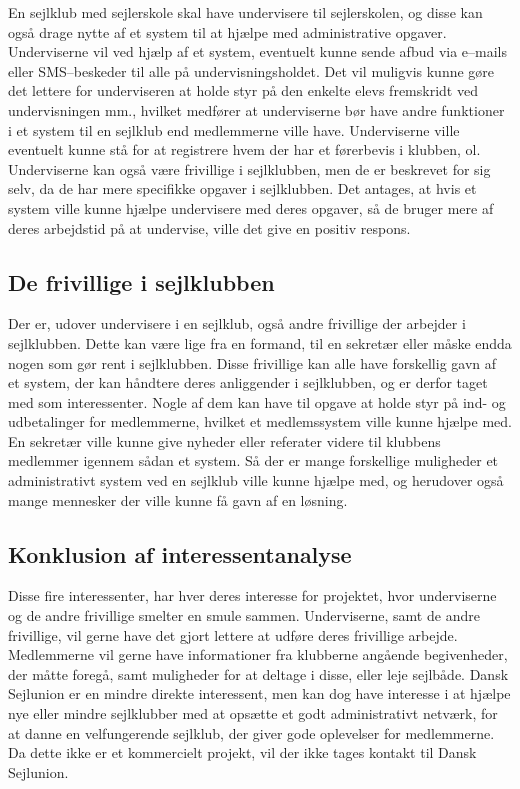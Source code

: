 En sejlklub med sejlerskole skal have undervisere til sejlerskolen, og disse kan også drage nytte af et system
til at hjælpe med administrative opgaver. 
Underviserne vil ved hjælp af et system, eventuelt kunne sende afbud via e--mails eller SMS--beskeder til alle på undervisningsholdet. 
Det vil muligvis kunne gøre det lettere for underviseren at holde styr på den enkelte elevs fremskridt ved undervisningen mm., hvilket medfører at
underviserne bør have andre funktioner i et system til en sejlklub end medlemmerne ville have. Underviserne
ville eventuelt kunne stå for at registrere hvem der har et førerbevis i klubben, ol. Underviserne kan også
være frivillige i sejlklubben, men de er beskrevet for sig selv, da de har mere specifikke opgaver i
sejlklubben. Det antages, at hvis et system ville kunne hjælpe undervisere med deres opgaver, så de bruger
mere af deres arbejdstid på at undervise, ville det give en positiv respons.


\subsection{De frivillige i sejlklubben}

Der er, udover undervisere i en sejlklub, også andre frivillige der arbejder i sejlklubben. Dette kan være
lige fra en formand, til en sekretær eller måske endda nogen som gør rent i sejlklubben. 
Disse frivillige kan alle have forskellig gavn af et system, der kan håndtere deres anliggender i sejlklubben, og er derfor taget med som interessenter. 
Nogle af dem kan have til opgave at holde styr på ind- og udbetalinger for medlemmerne, hvilket et medlemssystem ville kunne hjælpe med. 
En sekretær ville kunne give nyheder eller referater videre til klubbens medlemmer igennem sådan et system. 
Så der er mange forskellige muligheder et administrativt
system ved en sejlklub ville kunne hjælpe med, og herudover også mange mennesker der ville kunne få gavn af en løsning.


\subsection{Konklusion af interessentanalyse}

Disse fire interessenter, har hver deres interesse for projektet, hvor underviserne og de andre frivillige
smelter en smule sammen. 
Underviserne, samt de andre frivillige, vil gerne have det gjort lettere at udføre deres frivillige arbejde. Medlemmerne vil gerne have informationer fra klubberne angående begivenheder, der
måtte foregå, samt muligheder for at deltage i disse, eller leje sejlbåde. Dansk Sejlunion er en mindre
direkte interessent, men kan dog have interesse i at hjælpe nye eller mindre sejlklubber med at opsætte et
godt administrativt netværk, for at danne en velfungerende sejlklub, der giver gode oplevelser for medlemmerne.
Da dette ikke er et kommercielt projekt, vil der ikke tages kontakt til Dansk Sejlunion.
